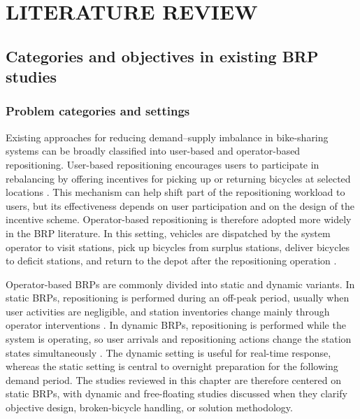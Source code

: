 \chapter{LITERATURE REVIEW}

\providecommand{\litYes}{\ensuremath{\surd}}
\providecommand{\litPartial}{P}

\section{Categories and objectives in existing BRP studies}

\subsection{Problem categories and settings}

Existing approaches for reducing demand--supply imbalance in bike-sharing systems can be broadly classified into user-based and operator-based repositioning. User-based repositioning encourages users to participate in rebalancing by offering incentives for picking up or returning bicycles at selected locations \citep{singlaIncentivizingUsersBalancing2015,panDeepReinforcementLearning2019,chengUserbasedBikeRebalancing2021,wangTwostageIncentiveMechanism2021}. This mechanism can help shift part of the repositioning workload to users, but its effectiveness depends on user participation and on the design of the incentive scheme. Operator-based repositioning is therefore adopted more widely in the BRP literature. In this setting, vehicles are dispatched by the system operator to visit stations, pick up bicycles from surplus stations, deliver bicycles to deficit stations, and return to the depot after the repositioning operation \citep{ravivStaticRepositioningBikesharing2013,brinkmannInventoryRoutingBike2016}.

Operator-based BRPs are commonly divided into static and dynamic variants. In static BRPs, repositioning is performed during an off-peak period, usually when user activities are negligible, and station inventories change mainly through operator interventions \citep{ravivStaticRepositioningBikesharing2013,forma3stepMathHeuristic2015,schuijbroekInventoryRebalancingVehicle2017}. In dynamic BRPs, repositioning is performed while the system is operating, so user arrivals and repositioning actions change the station states simultaneously \citep{contardoBalancingDynamicPublic2012,caggianiDynamicSimulationBased2013,caggianiModelingFrameworkDynamic2018,brinkmannDynamicLookaheadPolicies2019}. The dynamic setting is useful for real-time response, whereas the static setting is central to overnight preparation for the following demand period. The studies reviewed in this chapter are therefore centered on static BRPs, with dynamic and free-floating studies discussed when they clarify objective design, broken-bicycle handling, or solution methodology.

